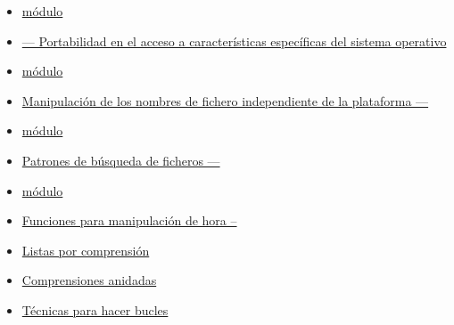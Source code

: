 \begin{itemize}

\item \href{http://docs.python.org/3.1/library/os.html}{módulo }

\item \href{http://www.doughellmann.com/PyMOTW/os/}{ --- Portabilidad en el acceso a características específicas del sistema operativo}

\item \href{http://docs.python.org/3.1/library/os.path.html}{módulo }

\item \href{http://www.doughellmann.com/PyMOTW/ospath/}{Manipulación de los nombres de fichero independiente de la plataforma --- }

\item \href{http://docs.python.org/3.1/library/glob.html}{módulo }

\item \href{http://www.doughellmann.com/PyMOTW/glob/}{Patrones de búsqueda de ficheros --- }

\item \href{http://docs.python.org/3.1/library/time.html}{módulo }

\item \href{http://www.doughellmann.com/PyMOTW/time/}{Funciones para manipulación de hora -- }


\item \href{http://docs.python.org/3.1/tutorial/datastructures.html#list-comprehensions}{Listas por comprensión}

\item \href{http://docs.python.org/3.1/tutorial/datastructures.html#nested-list-comprehensions}{Comprensiones anidadas}

\item \href{http://docs.python.org/3.1/tutorial/datastructures.html#looping-techniques}{Técnicas para hacer bucles}

\end{itemize}

